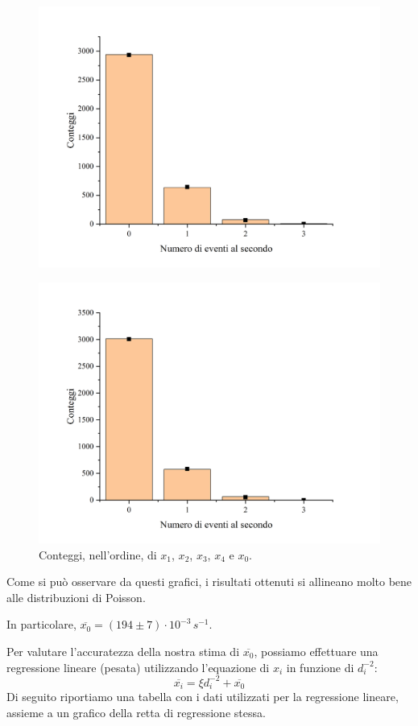\documentclass{article}
\begin{document}
\begin{center}
\begin{figure}[H]
        \includegraphics[trim={2cm .5cm 2.4cm 2.1cm},clip,width=.5\textwidth]{img/Geiger5.jpg}
    \end{figure}\begin{figure}[H]
        \centering
        \includegraphics[trim={2cm .5cm 2.4cm 2.1cm},clip,width=.5\textwidth]{img/Geiger0.jpg}
        \caption*{Conteggi, nell'ordine, di $x_1$, $x_2$, $x_3$, $x_4$ e $x_0$.}
    \end{figure}
\end{center}

Come si può osservare da questi grafici, i risultati ottenuti si allineano molto bene
alle distribuzioni di Poisson.

In particolare, $\overline{x_0} = \left(194\pm7\right)\cdot10^{-3}\,\unit{s^{-1}}$.

Per valutare l'accuratezza della nostra stima di $\overline{x_0}$, possiamo effettuare
una regressione lineare (pesata) utilizzando l'equazione di $x_i$ in funzione di
$d_i^{-2}$: \[\overline{x_i} = \xi d_i^{-2} + \overline{x_0}\]
Di seguito riportiamo una tabella con i dati utilizzati per la regressione lineare,
assieme a un grafico della retta di regressione stessa.
\end{document}
